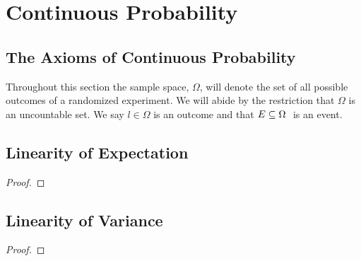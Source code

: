 

\chapter{Continuous Probability}
    \section[Axioms of Continuous Probability]{The Axioms of Continuous Probability}
        \begin{definition}
            Throughout this section the sample space, $\Omega$, will denote the set of
            all possible outcomes of a randomized experiment. We will abide by the restriction
            that $\Omega$ is an uncountable set. We say $l \in \Omega$ is an outcome and that
            $E \subseteq \Omega \ $ is an event.
        \end{definition}
        \begin{axiom}
        \end{axiom}
    \section{Linearity of Expectation}
        \begin{definition}
        \end{definition}
        \begin{definition}
        \end{definition}
        \begin{theorem}
        \end{theorem}
        \begin{proof}
        \end{proof}
    \section{Linearity of Variance}
        \begin{definition}
        \end{definition}
        \begin{theorem}
        \end{theorem}
        \begin{proof}
        \end{proof}
